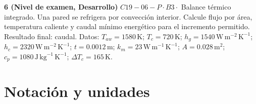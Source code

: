 \documentclass[10pt,openany]{book}
\begin{document}
\begin{tcolorbox}[title={Ejercicios propuestos}, studiumworked, breakable]
\noindent\textbf{6 (Nivel de examen, Desarrollo)}
\(C19-06-P \cdot B3 \cdot\) Balance térmico integrado. Una pared se refrigera por convección interior. Calcule flujo por área, temperatura caliente y caudal mínimo energético para el incremento permitido. Resultado final: caudal. Datos: \(T_{aw}=1580\, \mathrm{K}\); \(T_c=720\, \mathrm{K}\); \(h_g=1540\, \mathrm{W}\,\mathrm{m}^{-2}\,\mathrm{K}^{-1}\); \(h_c=2320\, \mathrm{W}\,\mathrm{m}^{-2}\,\mathrm{K}^{-1}\); \(t=0.0012\, \mathrm{m}\); \(k_m=23\, \mathrm{W}\,\mathrm{m}^{-1}\,\mathrm{K}^{-1}\); \(A=0.028\, \mathrm{m}^{2}\); \(c_p=1080\, \mathrm{J}\,\mathrm{kg}^{-1}\,\mathrm{K}^{-1}\); \(\Delta T_c=165\, \mathrm{K}\).
\end{tcolorbox}


\studiumchaptercheck

\appendix
\chapter{Notación y unidades}
\end{document}
